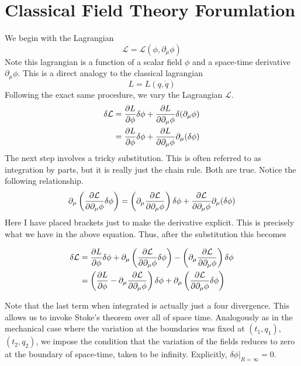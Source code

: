 

\section{Classical Field Theory Forumlation}
We begin with the Lagrangian
\begin{equation}
    \mathcal{L} = \mathcal{L}\left( \phi, \partial_\mu\phi \right)
\end{equation}
Note this lagrangian is a function of a scalar field $\phi$ and a space-time
derivative $\partial_\mu\phi$. This is a direct analogy to the classical lagrangian
\begin{equation}
    L = L\left( q, \dot{q} \right)
\end{equation}
Following the exact same procedure, we vary the Lagrangian $\mathcal{L}$.
\begin{align}
    \delta\mathcal{L} &= \pdv{L}{\phi}\delta\phi + \pdv{L}{\partial_\mu\phi}\delta(\partial_\mu\phi) \\
                      &= \pdv{L}{\phi}\delta\phi + \pdv{L}{\partial_\mu\phi}\partial_\mu(\delta\phi)
\end{align}
The next step involves a tricky substitution. This is often referred to as integration by parts,
but it is really just the chain rule. Both are true. Notice the following relationship.
\begin{equation}
    \partial_\mu\left( \pdv{\mathcal{L}}{\partial_\mu\phi} \delta\phi\right) = \left( \partial_\mu\pdv{\mathcal{L}}{\partial_\mu\phi} \right)\delta\phi + \pdv{\mathcal{L}}{\partial_\mu\phi} \partial_\mu(\delta\phi)
\end{equation}
Here I have placed brackets just to make the derivative explicit. This is precisely what we have in
the above equation. Thus, after the substitution this becomes

\begin{align}
    \delta\mathcal{L} &= \pdv{L}{\phi}\delta\phi + \partial_\mu\left( \pdv{\mathcal{L}}{\partial_\mu\phi} \delta\phi\right) - \left( \partial_\mu\pdv{\mathcal{L}}{\partial_\mu\phi} \right)\delta\phi \\
                      &= \left( \pdv{L}{\phi} - \partial_\mu\pdv{\mathcal{L}}{\partial_\mu\phi} \right)\delta\phi + \partial_\mu\left( \pdv{\mathcal{L}}{\partial_\mu\phi} \delta\phi\right)
\end{align}

Note that the last term when integrated is actually just a four divergence. This allows us to invoke
Stoke's theorem over all of space time. Analogously as in the mechanical case where the variation at the
boundaries was fixed at $(t_1,q_1)$, $(t_2,q_2)$, we impose the condition that the variation of the fields
reduces to zero at the boundary of space-time, taken to be infinity. Explicitly, $\delta\phi|_{R=\infty}=0$.


